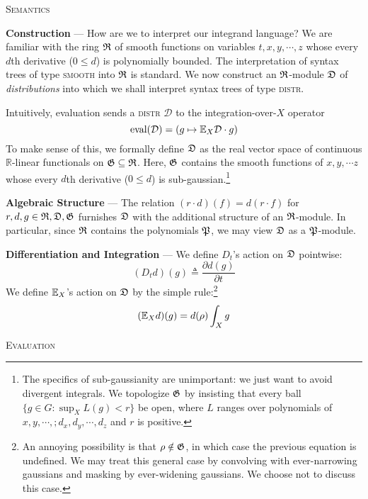 \begin{center}\large\textsc{Semantics}\end{center}

    \noindent\textbf{Construction} ---
    How are we to interpret our integrand language?  We are familiar with the
    ring $\frak R$ of smooth functions on variables $t,x,y,\cdots,z$ whose
    every $d$th derivative ($0\leq d$) is polynomially bounded.  The
    interpretation of syntax trees of type \textsc{smooth} into $\frak R$ is
    standard.  We now construct an $\frak R$-module $\frak D$ of
    \emph{distributions} into which we shall interpret syntax trees of type
    \textsc{distr}.

    Intuitively, evaluation sends a \textsc{distr} $\mathcal D$ to
    the integration-over-$X$ operator 
    $$
        \text{eval}({\mathcal D}) = \left(g \mapsto {\mathbb E}_X \mathcal D \cdot g\right)
    $$
    To make sense of this, we formally define $\frak D$ as the real vector
    space of continuous $\mathbb{R}$-linear functionals on $\frak G \subseteq
    \frak R$.  Here, $\frak G$ contains the smooth
    functions of $x,y,\cdots z$ whose every $d$th derivative ($0\leq d$) is
    sub-gaussian.\footnote{The specifics of sub-gaussianity are unimportant: we
    just want to avoid divergent integrals.  We topologize $\frak G$ by
    insisting that every ball $\{g \in G : \sup_X L(g) < r\}$ be open, where
    $L$ ranges over polynomials of $x,y,\cdots,;d_x,d_y,\cdots,d_z$ and $r$ is
    positive.}

    \textbf{Algebraic Structure} ---
    The relation $(r\cdot d)(f) = d(r\cdot f)$ for $r,d,g \in {\frak
    R},\frak{D},\frak{G}$ furnishes $\frak D$ with the additional structure of
    an $\frak R$-module.  In particular, since $\frak R$ contains the
    polynomials $\frak P$, we may view $\frak{D}$ as a $\frak P$-module. 

    \textbf{Differentiation and Integration} ---
    We define $D_t$'s action on $\frak D$ pointwise:
    $$
        (D_t d)(g) \triangleq \frac{\partial d(g)}{\partial t}
    $$
    We define ${\mathbb E}_X$'s action on $\frak D$ by the simple rule:\footnote{
        An annoying possibility is that $\rho \notin\frak G$, 
        in which case the previous equation is undefined.  We may treat this
        general case by convolving with ever-narrowing gaussians and masking
        by ever-widening gaussians.  We choose not to discuss this case.
    }
    $$
        ({\mathbb E}_X d)(g) = d(\rho) \int_X g
    $$

\begin{center}\large\textsc{Evaluation}\end{center}

